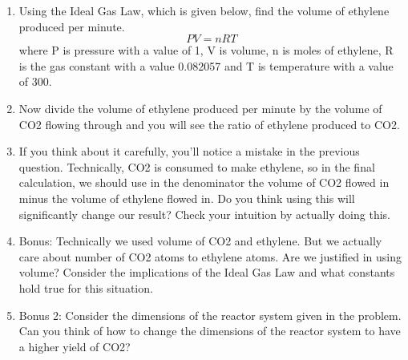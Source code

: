 \documentclass{article}
\begin{document}
\begin{enumerate}
\begin{enumerate}
        \item Using the Ideal Gas Law, which is given below, find the volume of ethylene produced per minute.
            \[ PV = nRT \]
        where P is pressure with a value of 1, V is volume, n is moles of ethylene, R is the gas constant with a value 0.082057 and T is temperature with a value of 300. 
        \item Now divide the volume of ethylene produced per minute by the volume of CO2 flowing through and you will see the ratio of ethylene produced to CO2.
        \item If you think about it carefully, you'll notice a mistake in the previous question. Technically, CO2 is consumed to make ethylene, so in the final calculation, we should use in the denominator the volume of CO2 flowed in minus the volume of ethylene flowed in. Do you think using this will significantly change our result? Check your intuition by actually doing this.
        \item Bonus: Technically we used volume of CO2 and ethylene. But we actually care about number of CO2 atoms to ethylene atoms. Are we justified in using volume? Consider the implications of the Ideal Gas Law and what constants hold true for this situation.
        \item Bonus 2: Consider the dimensions of the reactor system given in the problem. Can you think of how to change the dimensions of the reactor system to have a higher yield of CO2?
        \newline
        \newline
        \end{enumerate}
        

\end{enumerate}
\end{document}
